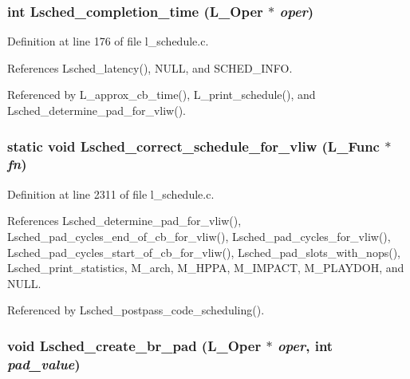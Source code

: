 \subsubsection{\setlength{\rightskip}{0pt plus 5cm}int Lsched\_\-completion\_\-time (L\_\-Oper $\ast$ {\em oper})}\label{l__schedule_8c_9e4ae98a71c7047b700d6f583cac4810}




Definition at line 176 of file l\_\-schedule.c.

References Lsched\_\-latency(), NULL, and SCHED\_\-INFO.

Referenced by L\_\-approx\_\-cb\_\-time(), L\_\-print\_\-schedule(), and Lsched\_\-determine\_\-pad\_\-for\_\-vliw().
\subsubsection{\setlength{\rightskip}{0pt plus 5cm}static void Lsched\_\-correct\_\-schedule\_\-for\_\-vliw (L\_\-Func $\ast$ {\em fn})\hspace{0.3cm}{\tt  [static]}}\label{l__schedule_8c_ae97816316ba9759ce6777c433e9f3c4}




Definition at line 2311 of file l\_\-schedule.c.

References Lsched\_\-determine\_\-pad\_\-for\_\-vliw(), Lsched\_\-pad\_\-cycles\_\-end\_\-of\_\-cb\_\-for\_\-vliw(), Lsched\_\-pad\_\-cycles\_\-for\_\-vliw(), Lsched\_\-pad\_\-cycles\_\-start\_\-of\_\-cb\_\-for\_\-vliw(), Lsched\_\-pad\_\-slots\_\-with\_\-nops(), Lsched\_\-print\_\-statistics, M\_\-arch, M\_\-HPPA, M\_\-IMPACT, M\_\-PLAYDOH, and NULL.

Referenced by Lsched\_\-postpass\_\-code\_\-scheduling().
\subsubsection{\setlength{\rightskip}{0pt plus 5cm}void Lsched\_\-create\_\-br\_\-pad (L\_\-Oper $\ast$ {\em oper}, int {\em pad\_\-value})}\label{l__schedule_8c_f3df48ff01088f85fd1e6b1ddf8ca06b}




